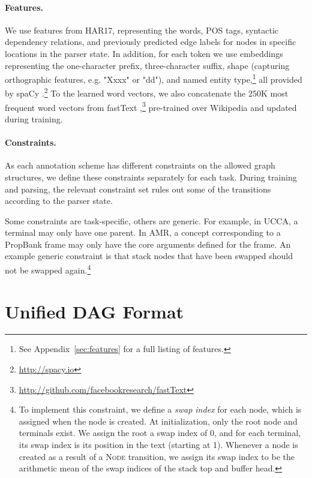 \documentclass[11pt,a4paper]{article}
\begin{document}
\paragraph{Features.}
We use features from HAR17,
representing the words, POS tags, syntactic dependency relations, and previously predicted edge labels
for nodes in specific locations in the parser state.
In addition, for each token
we use embeddings representing the one-character prefix, three-character suffix,
shape (capturing orthographic features, e.g. "Xxxx" or "dd"),
and named entity type,\footnote{See Appendix~\ref{sec:features} for a full listing of features.}
all provided by spaCy \cite{spacy2}.\footnote{\url{http://spacy.io}}
To the learned word vectors, we also concatenate the 250K most frequent word vectors from fastText
\cite{bojanowski2016enriching},\footnote{\scriptsize \mbox{\url{http://github.com/facebookresearch/fastText}}}
pre-trained over Wikipedia and updated during training.


\paragraph{Constraints.}
As each annotation scheme has different constraints on the allowed graph structures,
we define these constraints separately for each task.
During training and parsing, the relevant constraint set rules out some of the transitions
according to the parser state.


Some constraints are task-specific, others are generic.
For example, in UCCA, a terminal may only have one parent.
In AMR, a concept corresponding to a PropBank frame may only have 
the core arguments defined for the frame.
An example generic constraint is that stack nodes 
that have been swapped
should not be swapped again.\footnote{
 To implement this constraint, we define a \textit{swap index}
 for each node, which is assigned when the node is created.
 At initialization, only the root node and terminals exist.
 We assign the root a swap index of 0, and for each terminal, its swap index
 is its position in the text (starting at 1).
 Whenever a node is created as a result of a \textsc{Node}
 transition, we assign its swap index to be the arithmetic 
 mean of the swap indices of the stack top and buffer head.}


\section{Unified DAG Format}\label{sec:format}
\end{document}
